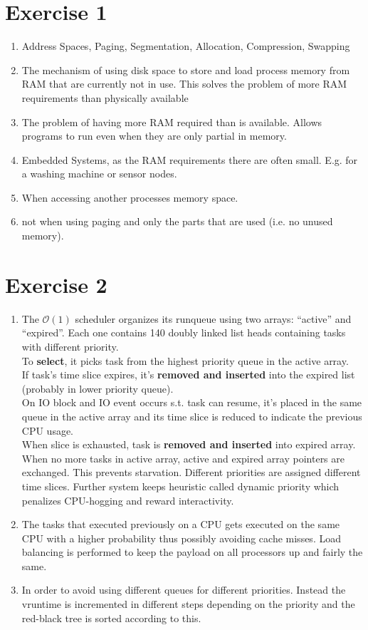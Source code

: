 \documentclass[a4paper,10pt]{article}
\begin{document}
\section*{Exercise 1}
\begin{enumerate}
 \item Address Spaces, Paging, Segmentation, Allocation, Compression, Swapping
 \item The mechanism of using disk space to store and load process memory from RAM that are currently not in use. This solves the problem of more RAM requirements than physically available
 \item The problem of having more RAM required than is available. Allows programs to run even when they are only partial in memory.
 \item Embedded Systems, as the RAM requirements there are often small. E.g. for a washing machine or sensor nodes.
 \item When accessing another processes memory space.
 \item not when using paging and only the parts that are used (i.e. no unused memory).
\end{enumerate}

\section*{Exercise 2}
\begin{enumerate}
    \item The $\mathcal{O}(1)$ scheduler organizes its runqueue using two arrays: "`active"' and "`expired"'. Each one contains 140 doubly linked list heads containing tasks with different priority. \\
    To \textbf{select}, it picks task from the highest priority queue in the active array. \\
    
    If task's time slice expires, it's \textbf{removed and inserted} into the expired list (probably in lower priority queue). \\
    On IO block and IO event occurs s.t. task can resume, it's placed in the same queue in the active array and its time slice is reduced to indicate the previous CPU usage. \\
    When slice is exhausted, task is \textbf{removed and inserted} into expired array. When no more tasks in active array, active and expired array pointers are exchanged. This prevents starvation. Different priorities are assigned different time slices. Further system keeps heuristic called dynamic priority which penalizes CPU-hogging and reward interactivity.
    \item The tasks that executed previously on a CPU gets executed on the same CPU  with a higher probability thus possibly avoiding cache misses. Load balancing is performed to keep the payload on all processors up and fairly the same.
    \item In order to avoid using different queues for different priorities. Instead the vruntime is incremented in different steps depending on the priority and the red-black tree is sorted according to this.
\end{enumerate}
\end{document}
